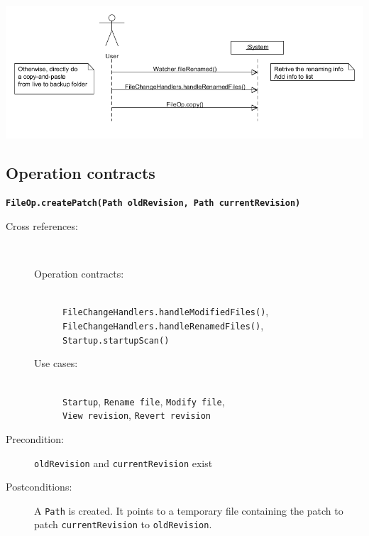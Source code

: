 \documentclass[12pt,a4paper]{article}
\begin{document}
\includegraphics[width=\linewidth]{images/fileRenamed_file3_ssd.png}


\subsection{Operation contracts}
\textbf{\texttt{FileOp.createPatch(Path oldRevision, Path currentRevision)}}
\begin{description} 
	\item[Cross references:] \hfill \vspace{-4ex} \\
		\begin{description}
		\item[Operation contracts:] \hfill \\
			\texttt{FileChangeHandlers.handleModifiedFiles()},\\
			\texttt{FileChangeHandlers.handleRenamedFiles()},\\
			\texttt{Startup.startupScan()}
		\item[Use cases:] \hfill \\
			\texttt{Startup}, \texttt{Rename file}, \texttt{Modify file},\\
			\texttt{View revision}, \texttt{Revert revision}
		\end{description}
	\item[Precondition:] \texttt{oldRevision} and \texttt{currentRevision} exist
	\item[Postconditions:] A \texttt{Path} is created. It points to a temporary file containing the patch to patch \texttt{currentRevision} to \texttt{oldRevision}.
\end{description}

\vspace{0.75cm}
\end{document}
